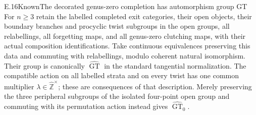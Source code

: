 \begin{result}{E.16}{Known}{The decorated genus-zero completion has automorphism group GT}
For $n\geq3$ retain the labelled completed exit categories, their open
objects, their boundary branches and procyclic twist subgroups in the
open groups, all relabellings, all forgetting maps, and all genus-zero
clutching maps, with their actual composition identifications.  Take
continuous equivalences preserving this data and commuting with
relabellings, modulo coherent natural isomorphism.  Their group is
canonically $\widehat{\operatorname{GT}}$ in the standard tangential
normalization.  The compatible action on all labelled strata and on
every twist has one common multiplier
$\lambda\in\widehat{\mathbb Z}^{\times}$; these are consequences of
that description.  Merely preserving the three peripheral subgroups
of the isolated four-point open group and commuting with its
permutation action instead gives
$\widehat{\operatorname{GT}}_0$.
\end{result}

